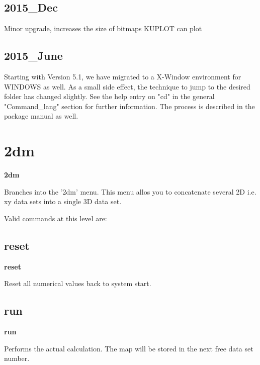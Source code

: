 \subsection*{2015\_Dec}
\par
Minor upgrade, increases the size of bitmaps KUPLOT can plot 
\subsection*{2015\_June}
\par
Starting with Version 5.1, we have migrated to a X-Window 
environment for WINDOWS as well. As a small side effect, 
the technique to jump to the desired folder has changed slightly. 
See the help entry on "cd" in the general "Command\_lang" section 
for further information. The process is described in the 
package manual as well. 
\section{2dm}
{\bf 2dm \par }
\par
\vspace{3pt}
Branches into the '2dm' menu. 
This menu allos you to concatenate several 2D i.e. xy data 
sets into a single 3D data set. 
\par
Valid commands at this level are: 
\subsection*{reset}
{\bf reset \par }
\par
\vspace{3pt}
Reset all numerical values back to system start. 
\subsection*{run}
{\bf run \par }
\par
\vspace{3pt}
Performs the actual calculation. The map will be 
stored in the next free data set number. 
